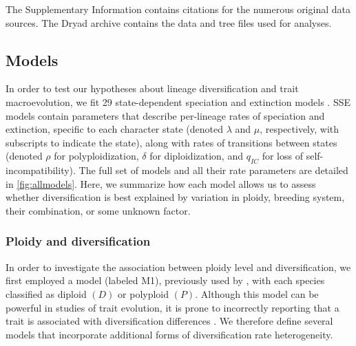 The Supplementary Information contains citations for the numerous original data sources. %
The Dryad archive contains the data and tree files used for analyses. %

\subsection{Models}

In order to test our hypotheses about lineage diversification and trait macroevolution, we fit 29 state-dependent speciation and extinction models \citep[BiSSE, MuSSE, HiSSE;][]{maddison_2007, fitzjohn_2012, beaulieu_2016}.
SSE models contain parameters that describe per-lineage rates of speciation and extinction, specific to each character state (denoted $\lambda$ and $\mu$, respectively, with subscripts to indicate the state), along with rates of transitions between states (denoted $\rho$ for polyploidization, $\delta$ for diploidization, and $q_{IC}$ for loss of self-incompatibility).
The full set of models and all their rate parameters are detailed in \cref{fig:allmodels}.
Here, we summarize how each model allows us to assess whether diversification is best explained by variation in ploidy, breeding system, their combination, or some unknown factor.

\subsubsection{Ploidy and diversification}

In order to investigate the association between ploidy level and diversification, we first employed a model (labeled M1), previously used by \citet{mayrose_2011}, with each species classified as diploid $(D)$ or polyploid $(P)$.
Although this model can be powerful in studies of trait evolution, it is prone to incorrectly reporting that a trait is associated with diversification differences \citep{maddison_2015, rabosky_2015}.
We therefore define several models that incorporate additional forms of diversification rate heterogeneity.

